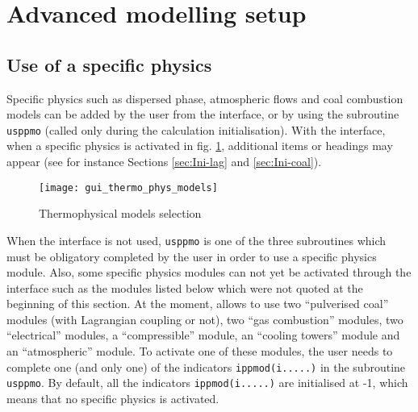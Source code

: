 {{{%
\section{Advanced modelling setup}

\subsection{Use of a specific physics}
\label{prg_usppmo}%
Specific physics such as dispersed phase, atmospheric flows and coal combustion models can be added by the user from the interface, or by using the subroutine \texttt{usppmo} (called only during the calculation initialisation). With the interface, when a specific physics is activated in fig. \ref{fig:5_GUI}, additional items or headings may appear (see for instance Sections \ref{sec:Ini-lag} and \ref{sec:Ini-coal}).

\begin{figure}[!ht]
\begin{center}
\texttt{[image: gui\_thermo\_phys\_models]}
\caption{Thermophysical models selection}
\label{fig:5_GUI}
\end{center}
\end{figure}

When the interface is not used, \texttt{usppmo} is one of the three subroutines which must be obligatory completed by the user in order to use a specific physics module. Also, some specific physics modules can not yet be activated through the interface such as the modules listed below which were not quoted at the beginning of this section.
At the moment, \CS allows to use two ``pulverised coal'' modules
(with Lagrangian coupling or not), two ``gas combustion'' modules, two
``electrical'' modules, a ``compressible'' module, an ``cooling towers'' module and an ``atmospheric'' module. To activate one of
these modules, the user needs to complete one (and only one) of the
indicators \texttt{ippmod(i.....)} in the subroutine
\texttt{usppmo}. By default, all the indicators \texttt{ippmod(i.....)} are
initialised at -1, which means that no specific physics is activated.

}}}
